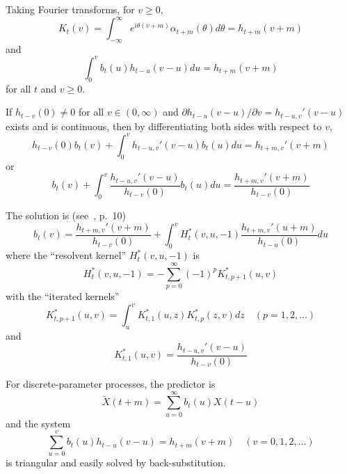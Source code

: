 \documentclass[11pt]{article}
\begin{document}
Taking Fourier transforms, for $v \geq 0$,
\begin{equation}
K_t(v) = \int_{-\infty}^{\infty} e^{i\theta(v+m)} \alpha_{t+m}(\theta) d\theta = h_{t+m}(v+m)
\label{eq:Kt}
\end{equation}
and
\begin{equation}
\int_0^v b_t(u) h_{t-u}(v-u) du = h_{t+m}(v+m)
\label{eq:freqtriangular}
\end{equation}
for all $t$ and $v \geq 0$.

If $h_{t-v}(0) \neq 0$ for all $v \in (0, \infty)$ and $\partial h_{t-u}(v-u)/\partial v = h_{t-u,v}'(v-u)$ exists and is continuous, then by differentiating both sides with respect to $v$,
\begin{equation}
h_{t-v}(0) b_t(v) + \int_0^v h_{t-u,v}'(v-u) b_t(u) du = h_{t+m,v}'(v+m)
\label{eq:freqtriangular2}
\end{equation}
or
\begin{equation}
b_t(v) + \int_0^v \frac{h_{t-u,v}'(v-u)}{h_{t-v}(0)} b_t(u) du = \frac{h_{t+m,v}'(v+m)}{h_{t-v}(0)}
\label{eq:freqtriangular3}
\end{equation}

The solution is (see~\cite{Tricomi1957}, p.~10)
\begin{equation}
b_t(v) = \frac{h_{t+m,v}'(v+m)}{h_{t-v}(0)} + \int_0^v H_t^*(v,u,-1) \frac{h_{t+m,v}'(u+m)}{h_{t-u}(0)} du
\label{eq:btfinal}
\end{equation}
where the ``resolvent kernel'' $H_t^*(v,u,-1)$ is
\begin{equation}
H_t^*(v,u,-1) = -\sum_{p=0}^{\infty} (-1)^p K_{t,p+1}^*(u,v)
\label{eq:resolvent}
\end{equation}
with the ``iterated kernels''
\begin{equation}
K_{t,p+1}^*(u,v) = \int_u^v K_{t,1}^*(u,z) K_{t,p}^*(z,v) dz \quad (p=1,2,\ldots)
\label{eq:iteratedkernels}
\end{equation}
and
\begin{equation}
K_{t,1}^*(u,v) = \frac{h_{t-u,v}'(v-u)}{h_{t-v}(0)}
\label{eq:firstkernel}
\end{equation}

For discrete-parameter processes, the predictor is
\begin{equation}
\tilde{X}(t+m) = \sum_{u=0}^{\infty} b_t(u) X(t-u)
\label{eq:discpred}
\end{equation}
and the system
\begin{equation}
\sum_{u=0}^v b_t(u) h_{t-u}(v-u) = h_{t+m}(v+m) \quad (v=0,1,2,\ldots)
\label{eq:discfreqtriangular}
\end{equation}
is triangular and easily solved by back-substitution.
\end{document}
